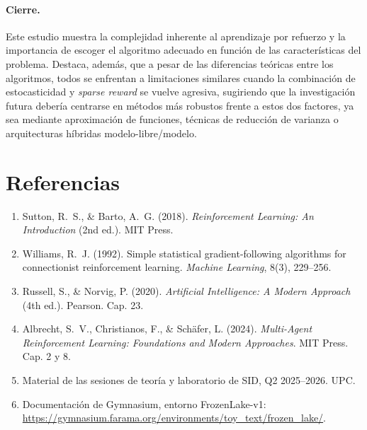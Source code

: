 \documentclass[11pt,a4paper]{article}
\begin{document}
\paragraph{Cierre.} Este estudio muestra la complejidad inherente al aprendizaje por refuerzo y la importancia de escoger el algoritmo adecuado en función de las características del problema. Destaca, además, que a pesar de las diferencias teóricas entre los algoritmos, todos se enfrentan a limitaciones similares cuando la combinación de estocasticidad y \emph{sparse reward} se vuelve agresiva, sugiriendo que la investigación futura debería centrarse en métodos más robustos frente a estos dos factores, ya sea mediante aproximación de funciones, técnicas de reducción de varianza o arquitecturas híbridas modelo-libre/modelo.

\section*{Referencias}

\begin{enumerate}
  \item Sutton, R.~S., \& Barto, A.~G. (2018). \textit{Reinforcement Learning: An Introduction} (2nd ed.). MIT Press.
  \item Williams, R.~J. (1992). Simple statistical gradient-following algorithms for connectionist reinforcement learning. \textit{Machine Learning}, 8(3), 229--256.
  \item Russell, S., \& Norvig, P. (2020). \textit{Artificial Intelligence: A Modern Approach} (4th ed.). Pearson. Cap. 23.
  \item Albrecht, S.~V., Christianos, F., \& Schäfer, L. (2024). \textit{Multi-Agent Reinforcement Learning: Foundations and Modern Approaches}. MIT Press. Cap. 2 y 8.
  \item Material de las sesiones de teoría y laboratorio de SID, Q2 2025--2026. UPC.
  \item Documentación de Gymnasium, entorno FrozenLake-v1: \url{https://gymnasium.farama.org/environments/toy_text/frozen_lake/}.
\end{enumerate}
\end{document}
